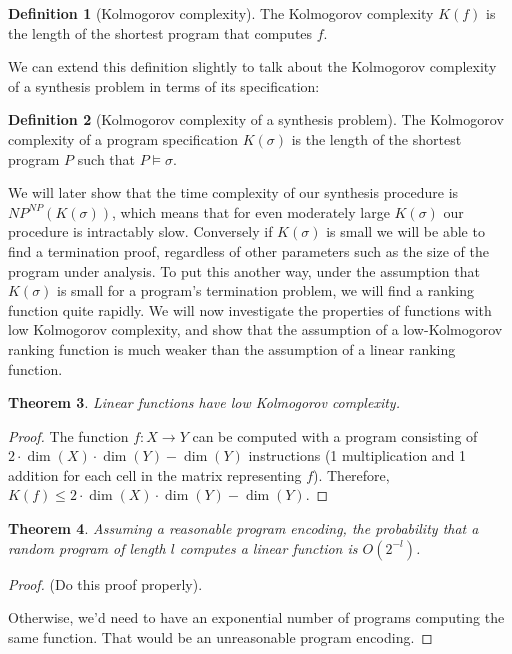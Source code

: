 \documentclass[preprint]{sigplanconf}
\newtheorem{theorem}{Theorem}
\theoremstyle{definition}
\newtheorem{definition}[theorem]{Definition}
\begin{document}
\begin{definition}[Kolmogorov complexity]
 The Kolmogorov complexity $K(f)$ is the length of the shortest program that
 computes $f$.
\end{definition}

We can extend this definition slightly to talk about the Kolmogorov complexity of a
synthesis problem in terms of its specification:

\begin{definition}[Kolmogorov complexity of a synthesis problem]
 The Kolmogorov complexity of a program specification $K(\sigma)$ is the length of the shortest
 program $P$ such that $P \models \sigma$.
\end{definition}

We will later show that the time complexity of our synthesis procedure is $NP^{NP}(K(\sigma))$,
which means that for even moderately large $K(\sigma)$ our procedure is intractably slow.  Conversely
if $K(\sigma)$ is small we will be able to find a termination proof, regardless of other parameters
such as the size of the program under analysis.  To put this another way, under the assumption
that $K(\sigma)$ is small for a program's termination problem, we will find a ranking function
quite rapidly.  We will now investigate the properties of functions with low Kolmogorov complexity,
and show that the assumption of a low-Kolmogorov ranking function is much weaker than the assumption
of a linear ranking function.


\begin{theorem}
 Linear functions have low Kolmogorov complexity.
\end{theorem}

\begin{proof}
 The function $f: X \to Y$ can be computed with a program consisting of
 $2 \cdot \dim(X) \cdot \dim(Y) - \dim(Y)$ instructions (1 multiplication and 1 addition for
 each cell in the matrix representing $f$).  Therefore,
 $K(f) \leq 2 \cdot \dim(X) \cdot \dim(Y) - \dim(Y)$.
\end{proof}

\begin{theorem}
Assuming a reasonable program encoding, the probability that a random program of length $l$ computes
a linear function is $O(2^{-l})$.
\end{theorem}

\begin{proof}
 (Do this proof properly).
 
 Otherwise, we'd need to have an exponential number of programs computing the same function.
 That would be an unreasonable program encoding.
\end{proof}
\end{document}

